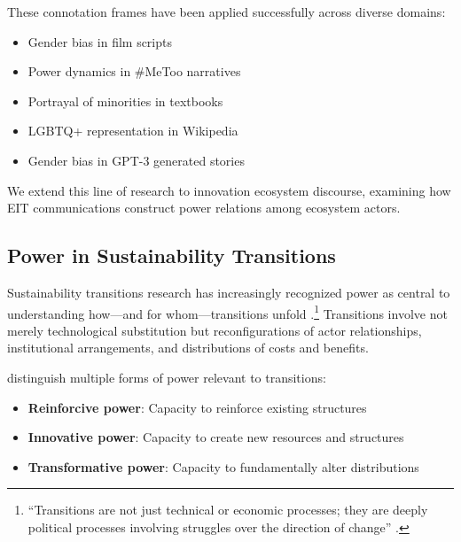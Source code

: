 \documentclass[../main.tex]{subfiles}
\begin{document}
These connotation frames have been applied successfully across diverse domains:

\begin{itemize}
    \item Gender bias in film scripts \cite{sap2017connotation}
    \item Power dynamics in \#MeToo narratives \cite{field2019contextual}
    \item Portrayal of minorities in textbooks \cite{lucy2020content}
    \item LGBTQ+ representation in Wikipedia \cite{park2021multilingual}
    \item Gender bias in GPT-3 generated stories \cite{lucy2021gender}
\end{itemize}

We extend this line of research to innovation ecosystem discourse, examining how EIT communications construct power relations among ecosystem actors.

\subsection{Power in Sustainability Transitions}

Sustainability transitions research has increasingly recognized power as central to understanding how---and for whom---transitions unfold \cite{avelino2017power,meadowcroft2009politics,geels2014regime}.\footnote{``Transitions are not just technical or economic processes; they are deeply political processes involving struggles over the direction of change'' \cite{meadowcroft2009politics}.} Transitions involve not merely technological substitution but reconfigurations of actor relationships, institutional arrangements, and distributions of costs and benefits.

\cite{avelino2017power} distinguish multiple forms of power relevant to transitions:

\begin{itemize}
    \item \textbf{Reinforcive power}: Capacity to reinforce existing structures
    \item \textbf{Innovative power}: Capacity to create new resources and structures
    \item \textbf{Transformative power}: Capacity to fundamentally alter distributions
\end{itemize}
\end{document}
